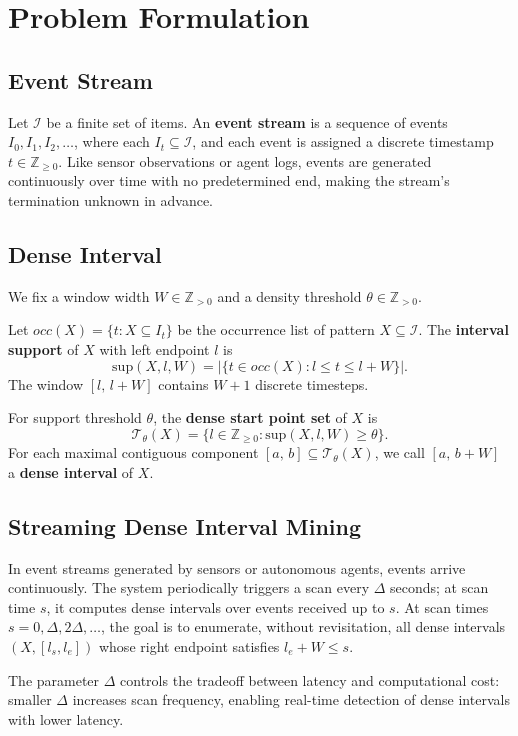 \section{Problem Formulation}

\subsection{Event Stream}

Let $\mathcal{I}$ be a finite set of items.
An \textbf{event stream} is a sequence of events
$I_0, I_1, I_2, \ldots$, where each $I_t \subseteq \mathcal{I}$,
and each event is assigned a discrete timestamp $t \in \mathbb{Z}_{\geq 0}$.
Like sensor observations or agent logs, events are generated
continuously over time with no predetermined end,
making the stream's termination unknown in advance.

\subsection{Dense Interval}

We fix a window width $W \in \mathbb{Z}_{>0}$ and a density threshold $\theta \in \mathbb{Z}_{>0}$.

\begin{definition}
Let $\mathit{occ}(X) = \{t : X \subseteq I_t\}$ be the occurrence list of
pattern $X \subseteq \mathcal{I}$.
The \textbf{interval support} of $X$ with left endpoint $l$ is
\[
  \mathrm{sup}(X, l, W) = |\{t \in \mathit{occ}(X) : l \leq t \leq l + W\}|.
\]
The window $[l,\, l{+}W]$ contains $W{+}1$ discrete timesteps.
\end{definition}

\begin{definition}
For support threshold $\theta$, the \textbf{dense start point set} of $X$ is
\[
  \mathcal{T}_\theta(X) = \{l \in \mathbb{Z}_{\geq 0} : \mathrm{sup}(X, l, W) \geq \theta\}.
\]
For each maximal contiguous component $[a,\, b] \subseteq \mathcal{T}_\theta(X)$,
we call $[a,\, b{+}W]$ a \textbf{dense interval} of $X$.
\end{definition}

\subsection{Streaming Dense Interval Mining}

In event streams generated by sensors or autonomous agents,
events arrive continuously.
The system periodically triggers a scan every $\Delta$ seconds;
at scan time $s$, it computes dense intervals over events
received up to $s$.
At scan times $s = 0, \Delta, 2\Delta, \ldots$, the goal is to
enumerate, without revisitation, all dense intervals
$(X, [l_s, l_e])$ whose right endpoint satisfies $l_e + W \leq s$.

The parameter $\Delta$ controls the tradeoff between latency and
computational cost: smaller $\Delta$ increases scan frequency,
enabling real-time detection of dense intervals with lower latency.
